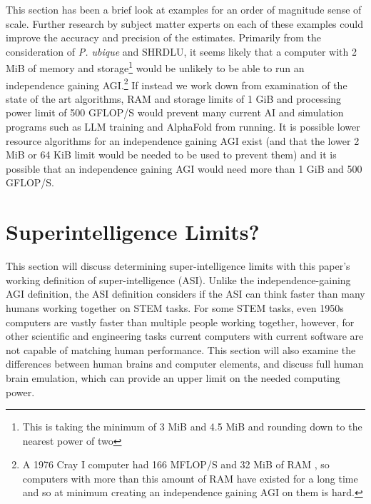 \documentclass[letterpaper,twocolumn]{article}
\begin{document}
This section has been a brief look at examples for an order of
magnitude sense of scale. Further research by subject matter experts
on each of these examples could improve the accuracy and precision of
the estimates.  Primarily from the consideration of {\em P. ubique}
and SHRDLU, it seems likely that a computer with 2 MiB of memory and
storage\footnote{This is taking the minimum of 3 MiB and 4.5 MiB and
rounding down to the nearest power of two} would be unlikely to be
able to run an independence gaining AGI.\footnote{A 1976 Cray I
computer had 166 MFLOP/S and 32 MiB of RAM
\citep[pg.~43]{pattersonandhennessy2nd}, so computers with more than
this amount of RAM have existed for a long time and so at minimum
creating an independence gaining AGI on them is hard.}  If instead we
work down from examination of the state of the art algorithms, RAM and
storage limits of 1 GiB and processing power limit of 500 GFLOP/S
would prevent many current AI and simulation programs such as LLM
training and AlphaFold from running. It is possible lower resource
algorithms for an independence gaining AGI exist (and that the lower 2
MiB or 64 KiB limit would be needed to be used to prevent them) and it
is possible that an independence gaining AGI would need more than 1
GiB and 500 GFLOP/S.

\section{Superintelligence Limits?}

This section will discuss determining super-intelligence limits with
this paper's working definition of super-intelligence (ASI). Unlike
the independence-gaining AGI definition, the ASI definition considers
if the ASI can think faster than many humans working together on
STEM tasks. For some STEM tasks, even 1950s computers are vastly
faster than multiple people working together, however, for other
scientific and engineering tasks current computers with current
software are not capable of matching human performance. This section
will also examine the differences between human brains and computer
elements, and discuss full human brain emulation, which can provide an
upper limit on the needed computing power.
\end{document}
